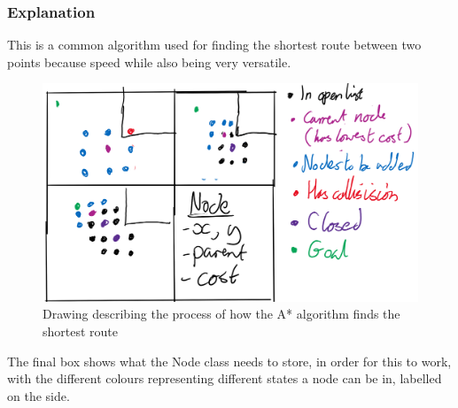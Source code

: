 \documentclass[../Main.tex]{subfiles}
\begin{document}
        \subsubsection{Explanation}
            This is a common algorithm used for finding the shortest route between two points because speed while also being very versatile.
            \begin{figure}[hbt!]
                \centerline{\includegraphics[scale=0.3]{img/Design/A-star algorithm.png}}
                \caption{Drawing describing the process of how the A* algorithm finds the shortest route}
                \label{fig:AStar}
            \end{figure}

            The final box shows what the Node class needs to store, in order for this to work, with the different colours representing different states a node can be in, labelled on the side.
\end{document}
